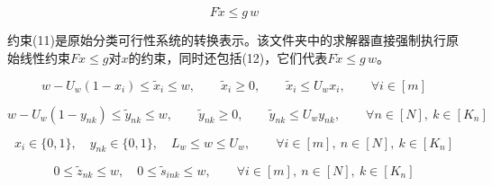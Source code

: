 \documentclass[11pt,a4paper]{article}
\begin{document}
\begin{equation}
F \tilde{x} \le g\,w
\tag{11}
\end{equation}

约束\textnormal{(11)}是原始分类可行性系统的转换表示。该文件夹中的求解器直接强制执行原始线性约束$Fx \le g$对$x$的约束，同时还包括\textnormal{(12)}，它们代表$F\tilde{x} \le g\,w$。

\begin{equation}
w - U_w(1-x_i) \le \tilde{x}_i \le w,
\qquad
\tilde{x}_i \ge 0,
\qquad
\tilde{x}_i \le U_w x_i,
\qquad \forall i \in [m]
\tag{12}
\end{equation}

\begin{equation}
w - U_w(1-y_{nk}) \le \tilde{y}_{nk} \le w,
\qquad
\tilde{y}_{nk} \ge 0,
\qquad
\tilde{y}_{nk} \le U_w y_{nk},
\qquad \forall n \in [N],\ k \in [K_n]
\tag{13}
\end{equation}

\begin{equation}
x_i \in \{0,1\},
\quad
y_{nk} \in \{0,1\},
\quad
L_w \le w \le U_w,
\qquad \forall i \in [m],\ n \in [N],\ k \in [K_n]
\tag{14}
\end{equation}

\begin{equation}
0 \le \tilde{z}_{nk} \le w,
\quad
0 \le \tilde{s}_{ink} \le w,
\qquad \forall i \in [m],\ n \in [N],\ k \in [K_n]
\tag{15}
\end{equation}
\end{document}
